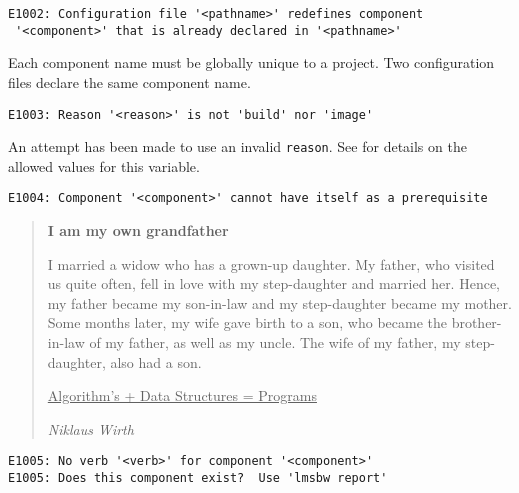 \begin{footnotesize}
\begin{verbatim}
E1002: Configuration file '<pathname>' redefines component
 '<component>' that is already declared in '<pathname>'
\end{verbatim}
\end{footnotesize}

Each component name must be globally unique to a project.  Two
configuration files declare the same component name.


\begin{footnotesize}
\begin{verbatim}
E1003: Reason '<reason>' is not 'build' nor 'image'
\end{verbatim}
\end{footnotesize}

An attempt has been made to use an invalid \texttt{reason}.  See
 for details on the allowed values for this
variable.


\begin{footnotesize}
\begin{verbatim}
E1004: Component '<component>' cannot have itself as a prerequisite
\end{verbatim}
\end{footnotesize}

\begin{quote}
  \textbf{I am my own grandfather}

  I married a widow who has a grown-up daughter.  My father, who
  visited us quite often, fell in love with my step-daughter and
  married her.  Hence, my father became my son-in-law and my
  step-daughter became my mother.  Some months later, my wife gave
  birth to a son, who became the brother-in-law of my father, as well
  as my uncle. The wife of my father, my step-daughter, also had a
  son.

  \underline{Algorithm's + Data Structures = Programs}

  \emph{Niklaus Wirth}
\end{quote}


\begin{footnotesize}
\begin{verbatim}
E1005: No verb '<verb>' for component '<component>'
E1005: Does this component exist?  Use 'lmsbw report'
\end{verbatim}
\end{footnotesize}

